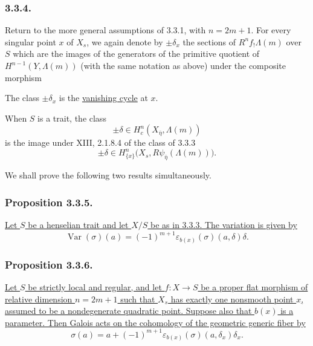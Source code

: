 \subsubsection*{3.3.4.}
Return to the more general assumptions of 3.3.1, with $n=2m+1$.
For every singular point $x$ of $X_s$, we again denote by
$\pm\delta_x$ the sections of $R^nf_!\Lambda(m)$ over $S$ which are
the images of the generators of the primitive quotient of
$H^{n-1}(Y,\Lambda(m))$ (with the same notation as above) under the
composite morphism
\begin{center}
\end{center}
The class $\pm\delta_x$ is the \underline{vanishing cycle} at $x$.

When $S$ is a trait, the class
\[
\pm\delta\in H_c^n(X_{\bar\eta},\Lambda(m))
\]
is the image under XIII, 2.1.8.4 of the class of 3.3.3
\[
\pm\delta\in
H^n_{\{x\}}\bigl(X_s,R\psi_{\bar\eta}(\Lambda(m))\bigr).
\]

We shall prove the following two results simultaneously.

\subsubsection*{Proposition 3.3.5.}
\underline{Let $S$ be a henselian trait and let $X/S$ be as in
3.3.3.  The variation is given by}
\[
\operatorname{Var}(\sigma)(a)
=(-1)^{m+1}\varepsilon_{b(x)}(\sigma)(a,\delta)\delta.
\]

\subsubsection*{Proposition 3.3.6.}
\underline{Let $S$ be strictly local and regular, and let
$f:X\to S$ be a proper flat morphism of relative dimension
$n=2m+1$ such that $X_s$ has exactly one nonsmooth point $x$, assumed
to be a nondegenerate quadratic point.  Suppose also that $b(x)$ is
a parameter.  Then Galois acts on the cohomology of the geometric
generic fiber by}
\[
\sigma(a)=a+(-1)^{m+1}
\varepsilon_{b(x)}(\sigma)(a,\delta_x)\delta_x.
\]
